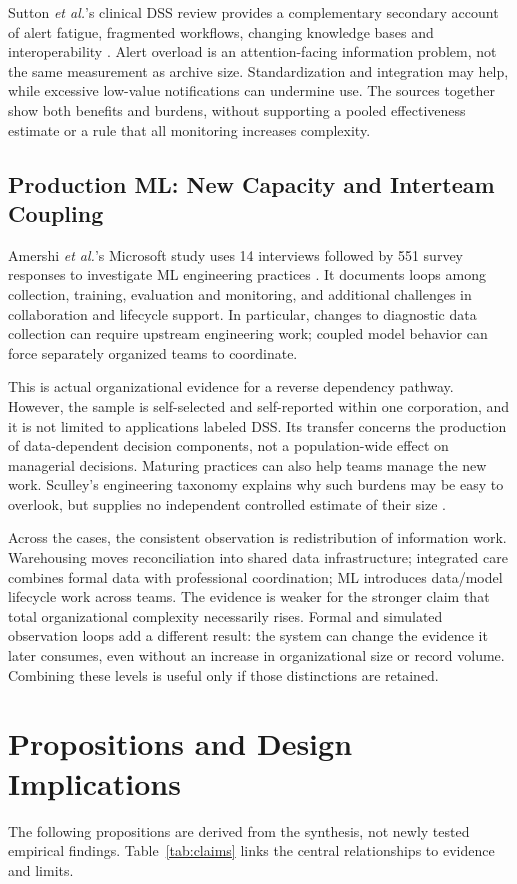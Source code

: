 \documentclass[journal]{IEEEtran}
\begin{document}
Sutton \emph{et al.}'s clinical DSS review provides a complementary secondary account of alert fatigue, fragmented workflows, changing knowledge bases and interoperability \cite{Sutton2020}. Alert overload is an attention-facing information problem, not the same measurement as archive size. Standardization and integration may help, while excessive low-value notifications can undermine use. The sources together show both benefits and burdens, without supporting a pooled effectiveness estimate or a rule that all monitoring increases complexity.

\subsection{Production ML: New Capacity and Interteam Coupling}
Amershi \emph{et al.}'s Microsoft study uses 14 interviews followed by 551 survey responses to investigate ML engineering practices \cite{amershi2019}. It documents loops among collection, training, evaluation and monitoring, and additional challenges in collaboration and lifecycle support. In particular, changes to diagnostic data collection can require upstream engineering work; coupled model behavior can force separately organized teams to coordinate.

This is actual organizational evidence for a reverse dependency pathway. However, the sample is self-selected and self-reported within one corporation, and it is not limited to applications labeled DSS. Its transfer concerns the production of data-dependent decision components, not a population-wide effect on managerial decisions. Maturing practices can also help teams manage the new work. Sculley's engineering taxonomy explains why such burdens may be easy to overlook, but supplies no independent controlled estimate of their size \cite{sculley2015}.

Across the cases, the consistent observation is redistribution of information work. Warehousing moves reconciliation into shared data infrastructure; integrated care combines formal data with professional coordination; ML introduces data/model lifecycle work across teams. The evidence is weaker for the stronger claim that total organizational complexity necessarily rises. Formal and simulated observation loops add a different result: the system can change the evidence it later consumes, even without an increase in organizational size or record volume. Combining these levels is useful only if those distinctions are retained.

\section{Propositions and Design Implications}
The following propositions are derived from the synthesis, not newly tested empirical findings. Table~\ref{tab:claims} links the central relationships to evidence and limits.
\end{document}

